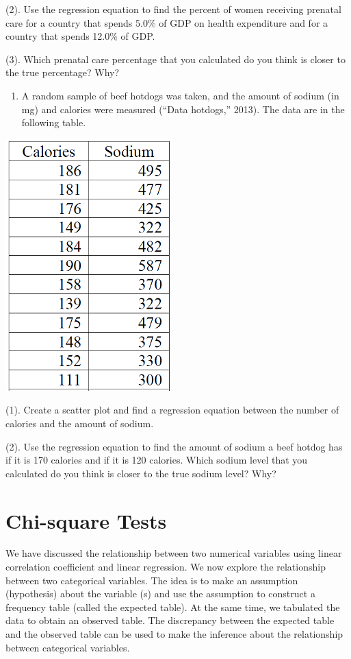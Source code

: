 \documentclass[
]{book}
\providecommand{\tightlist}{%
  \setlength{\itemsep}{0pt}\setlength{\parskip}{0pt}}
\begin{document}
(2). Use the regression equation to find the percent of women
receiving prenatal care for a country that spends 5.0\% of GDP on health expenditure and for a country that spends 12.0\% of GDP.

(3). Which prenatal care percentage that you calculated do you think is closer to the true percentage? Why?

\begin{enumerate}
\def\labelenumi{\arabic{enumi}.}
\setcounter{enumi}{2}
\tightlist
\item
  A random sample of beef hotdogs was taken, and the amount of sodium (in mg) and calories were measured (``Data hotdogs,'' 2013). The data are in the following table.
\end{enumerate}

\begin{center}\includegraphics[width=0.2\linewidth]{week12/ex03} \end{center}

(1). Create a scatter plot and find a regression equation between the number of calories and the amount of sodium.

(2). Use the regression equation to find the amount of sodium a beef hotdog has if it is 170 calories and if it is 120 calories. Which sodium level that you calculated do you think is closer to the true sodium level? Why?

\hypertarget{chi-square-tests}{%
\chapter{Chi-square Tests}\label{chi-square-tests}}

We have discussed the relationship between two numerical variables using linear correlation coefficient and linear regression. We now explore the relationship between two categorical variables. The idea is to make an assumption (hypothesis) about the variable (s) and use the assumption to construct a frequency table (called the expected table). At the same time, we tabulated the data to obtain an observed table. The discrepancy between the expected table and the observed table can be used to make the inference about the relationship between categorical variables.
\end{document}
